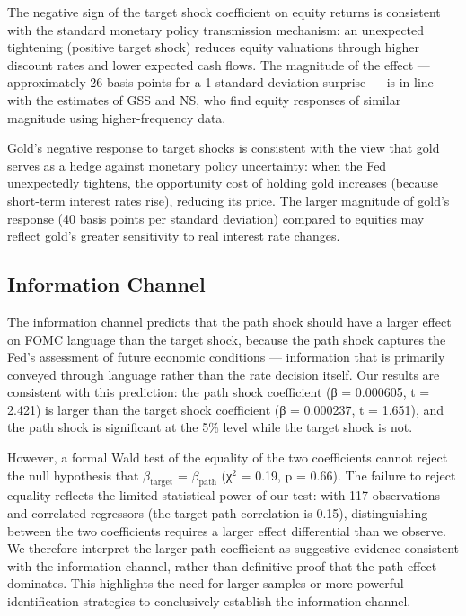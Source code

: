 \documentclass[12pt]{article}
\begin{document}
The negative sign of the target shock coefficient on equity returns is consistent with the standard monetary policy transmission mechanism: an unexpected tightening (positive target shock) reduces equity valuations through higher discount rates and lower expected cash flows. The magnitude of the effect --- approximately 26 basis points for a 1-standard-deviation surprise --- is in line with the estimates of GSS and NS, who find equity responses of similar magnitude using higher-frequency data.

Gold's negative response to target shocks is consistent with the view that gold serves as a hedge against monetary policy uncertainty: when the Fed unexpectedly tightens, the opportunity cost of holding gold increases (because short-term interest rates rise), reducing its price. The larger magnitude of gold's response (40 basis points per standard deviation) compared to equities may reflect gold's greater sensitivity to real interest rate changes.

\subsection{Information Channel}
The information channel predicts that the path shock should have a larger effect on FOMC language than the target shock, because the path shock captures the Fed's assessment of future economic conditions --- information that is primarily conveyed through language rather than the rate decision itself. Our results are consistent with this prediction: the path shock coefficient (β = 0.000605, t = 2.421) is larger than the target shock coefficient (β = 0.000237, t = 1.651), and the path shock is significant at the 5\% level while the target shock is not.

However, a formal Wald test of the equality of the two coefficients cannot reject the null hypothesis that $\beta_{\text{target}}$ = $\beta_{\text{path}}$ (χ$^2$ = 0.19, p = 0.66). The failure to reject equality reflects the limited statistical power of our test: with 117 observations and correlated regressors (the target-path correlation is 0.15), distinguishing between the two coefficients requires a larger effect differential than we observe. We therefore interpret the larger path coefficient as suggestive evidence consistent with the information channel, rather than definitive proof that the path effect dominates. This highlights the need for larger samples or more powerful identification strategies to conclusively establish the information channel.
\end{document}
